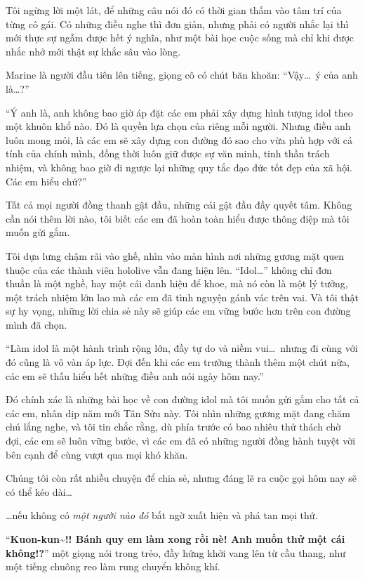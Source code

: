 \documentclass[../main.tex]{subfiles}
\begin{document}
Tôi ngừng lời một lát, để những câu nói đó có thời gian thấm vào tâm trí của từng cô gái. Có những điều nghe thì đơn giản, nhưng phải có người nhắc lại thì mới thực sự ngẫm được hết ý nghĩa, như một bài học cuộc sống mà chỉ khi được nhắc nhở mới thật sự khắc sâu vào lòng.

Marine là người đầu tiên lên tiếng, giọng cô có chút băn khoăn: ``Vậy\dots\ ý của anh là\dots?''

``Ý anh là, anh không bao giờ áp đặt các em phải xây dựng hình tượng idol theo một khuôn khổ nào. Đó là quyền lựa chọn của riêng mỗi người. Nhưng điều anh luôn mong mỏi, là các em sẽ xây dựng con đường đó sao cho vừa phù hợp với cá tính của chính mình, đồng thời luôn giữ được sự văn minh, tinh thần trách nhiệm, và không bao giờ đi ngược lại những quy tắc đạo đức tốt đẹp của xã hội. Các em hiểu chứ?''

Tất cả mọi người đồng thanh gật đầu, những cái gật đầu đầy quyết tâm. Không cần nói thêm lời nào, tôi biết các em đã hoàn toàn hiểu được thông điệp mà tôi muốn gửi gắm.

Tôi dựa lưng chậm rãi vào ghế, nhìn vào màn hình nơi những gương mặt quen thuộc của các thành viên hololive vẫn đang hiện lên. ``Idol\dots'' không chỉ đơn thuần là một nghề, hay một cái danh hiệu để khoe, mà nó còn là một lý tưởng, một trách nhiệm lớn lao mà các em đã tình nguyện gánh vác trên vai. Và tôi thật sự hy vọng, những lời chia sẻ này sẽ giúp các em vững bước hơn trên con đường mình đã chọn.

``Làm idol là một hành trình rộng lớn, đầy tự do và niềm vui\dots\ nhưng đi cùng với đó cũng là vô vàn áp lực. Đợi đến khi các em trưởng thành thêm một chút nữa, các em sẽ thấu hiểu hết những điều anh nói ngày hôm nay.''

Đó chính xác là những bài học về con đường idol mà tôi muốn gửi gắm cho tất cả các em, nhân dịp năm mới Tân Sửu này. Tôi nhìn những gương mặt đang chăm chú lắng nghe, và tôi tin chắc rằng, dù phía trước có bao nhiêu thử thách chờ đợi, các em sẽ luôn vững bước, vì các em đã có những người đồng hành tuyệt vời bên cạnh để cùng vượt qua mọi khó khăn.

Chúng tôi còn rất nhiều chuyện để chia sẻ, nhưng đáng lẽ ra cuộc gọi hôm nay sẽ có thể kéo dài\dots

\dots nếu không có \emph{một người nào đó} bất ngờ xuất hiện và phá tan mọi thứ.

``\textbf{Kuon-kun\~{}!! Bánh quy em làm xong rồi nè! Anh muốn thử một cái không!?}'' một giọng nói trong trẻo, đầy hứng khởi vang lên từ cầu thang, như một tiếng chuông reo làm rung chuyển không khí.
\end{document}
